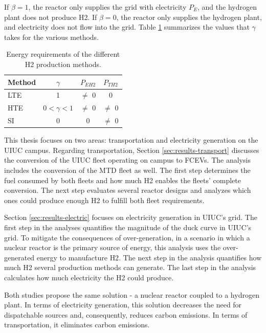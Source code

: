 If $\beta = 1$, the reactor only supplies the grid with electricity $P_E$, and the hydrogen plant does not produce \gls{H2}.
If $\beta = 0$, the reactor only supplies the hydrogen plant, and electricity does not flow into the grid.
Table \ref{tab:cogen1} summarizes the values that $\gamma$ takes for the various methods.

\begin{table}[htbp!]
    \centering
    \caption{Energy requirements of the different \gls{H2} production methods.}
    \begin{tabular}{lccc}
    \toprule
    Method    & $\gamma$         & $P_{EH2}$ & $P_{TH2}$ \\
	\midrule
    LTE & 1                & $\ne$ 0   & 0         \\
    HTE & $0 < \gamma < 1$ & $\ne$ 0   & $\ne$ 0   \\
    SI  & 0                & 0         & $\ne$ 0   \\
    \bottomrule
    \end{tabular}
    \label{tab:cogen1}
\end{table}

This thesis focuses on two areas: transportation and electricity generation on the \gls{UIUC} campus.
Regarding transportation, Section \ref{sec:results-transport} discusses the conversion of the \gls{UIUC} fleet operating on campus to \glspl{FCEV}.
The analysis includes the conversion of the \gls{MTD} fleet as well.
The first step determines the fuel consumed by both fleets and how much \gls{H2} enables the fleets' complete conversion.
The next step evaluates several reactor designs and analyzes which ones could produce enough \gls{H2} to fulfill both fleet requirements.

Section \ref{sec:results-electric} focuses on electricity generation in UIUC's grid.
The first step in the analyses quantifies the magnitude of the duck curve in UIUC's grid.
To mitigate the consequences of over-generation, in a scenario in which a nuclear reactor is the primary source of energy, this analysis uses the over-generated energy to manufacture \gls{H2}.
The next step in the analysis quantifies how much \gls{H2} several production methods can generate.
The last step in the analysis calculates how much electricity the \gls{H2} could produce.

Both studies propose the same solution - a nuclear reactor coupled to a hydrogen plant.
In terms of electricity generation, this solution decreases the need for dispatchable sources and, consequently, reduces carbon emissions.
In terms of transportation, it eliminates carbon emissions.


